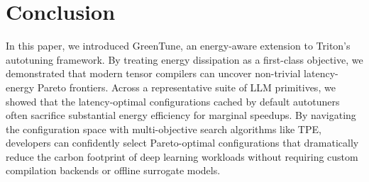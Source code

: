 \section{Conclusion}
\label{sec:conclusion}

In this paper, we introduced GreenTune, an energy-aware extension to Triton's autotuning framework. By treating energy dissipation as a first-class objective, we demonstrated that modern tensor compilers can uncover non-trivial latency-energy Pareto frontiers. Across a representative suite of LLM primitives, we showed that the latency-optimal configurations cached by default autotuners often sacrifice substantial energy efficiency for marginal speedups. By navigating the configuration space with multi-objective search algorithms like TPE, developers can confidently select Pareto-optimal configurations that dramatically reduce the carbon footprint of deep learning workloads without requiring custom compilation backends or offline surrogate models.
